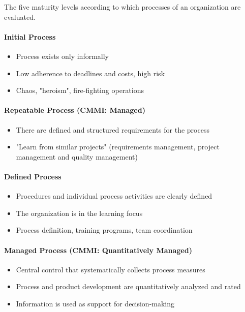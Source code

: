 \documentclass[11pt,a4paper]{article}
\begin{document}
The five maturity levels according to which processes of an organization are
evaluated.

\paragraph {Initial Process}
\begin {itemize} 
\item Process exists only informally
\item Low adherence to deadlines and costs, high risk
\item Chaos, "heroism", fire-fighting operations
\end {itemize}

\paragraph {Repeatable Process (CMMI: Managed)}
\begin {itemize} 
\item There are defined and structured requirements for the process
\item "Learn from similar projects" (requirements management, project
  management and quality management)
\end {itemize}

\paragraph {Defined Process}
\begin {itemize} 
\item Procedures and individual process activities are clearly defined
\item The organization is in the learning focus
\item Process definition, training programs, team coordination
\end {itemize}

\paragraph {Managed Process (CMMI: Quantitatively Managed)}
\begin {itemize} 
\item Central control that systematically collects process measures
\item Process and product development are quantitatively analyzed and rated
\item Information is used as support for decision-making 
\end {itemize}
\end{document}
